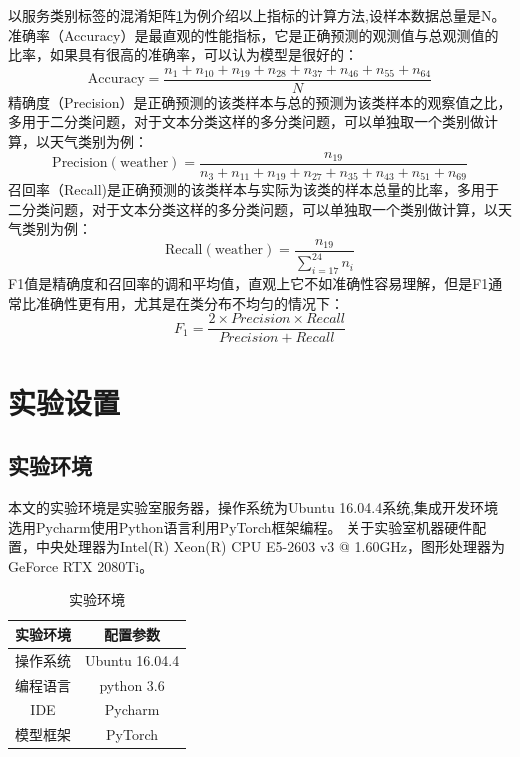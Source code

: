   以服务类别标签的混淆矩阵\ref{tab:hunxiao}为例介绍以上指标的计算方法,设样本数据总量是N。
  准确率（Accuracy）是最直观的性能指标，它是正确预测的观测值与总观测值的比率，如果具有很高的准确率，可以认为模型是很好的：
  \begin{equation}
  \text {Accuracy}=\frac{n_1+n_{10}+n_{19}+n_{28}+n_{37}+n_{46}+n_{55}+n_{64}}{N}
\end{equation}
精确度（Precision）是正确预测的该类样本与总的预测为该类样本的观察值之比，多用于二分类问题，对于文本分类这样的多分类问题，可以单独取一个类别做计算，以天气类别为例：
\begin{equation}
  \text {Precision}(\text {weather})=\frac{n_{19}}{n_3+n_{11}+n_{19}+n_{27}+n_{35}+n_{43}+n_{51}+n_{69}}
\end{equation}
召回率（Recall)是正确预测的该类样本与实际为该类的样本总量的比率，多用于二分类问题，对于文本分类这样的多分类问题，可以单独取一个类别做计算，以天气类别为例：
\begin{equation}
  \text {Recall}(\text {weather})=\frac{n_{19}}{\sum_{i=17}^{24} n_{i}}
\end{equation}
F1值是精确度和召回率的调和平均值，直观上它不如准确性容易理解，但是F1通常比准确性更有用，尤其是在类分布不均匀的情况下：
\begin{equation}
  F_1=\frac{2 \times Precision \times Recall}{ Precision + Recall}
\end{equation}

\section{实验设置}
\subsection{实验环境}
本文的实验环境是实验室服务器，操作系统为Ubuntu 16.04.4系统,集成开发环境选用Pycharm使用Python语言利用PyTorch框架编程。
关于实验室机器硬件配置，中央处理器为Intel(R) Xeon(R) CPU E5-2603 v3 @ 1.60GHz，图形处理器为GeForce RTX 2080Ti。

\begin{table}[htb]
  \centering
  \caption{实验环境}
  \label{tab:hunxiao}
\begin{tabular}{c|c}
\hline
实验环境&配置参数\\
\hline
操作系统&Ubuntu 16.04.4\\
编程语言&python 3.6\\
IDE&Pycharm\\
模型框架&PyTorch\\
\hline
\end{tabular}
\end{table}

